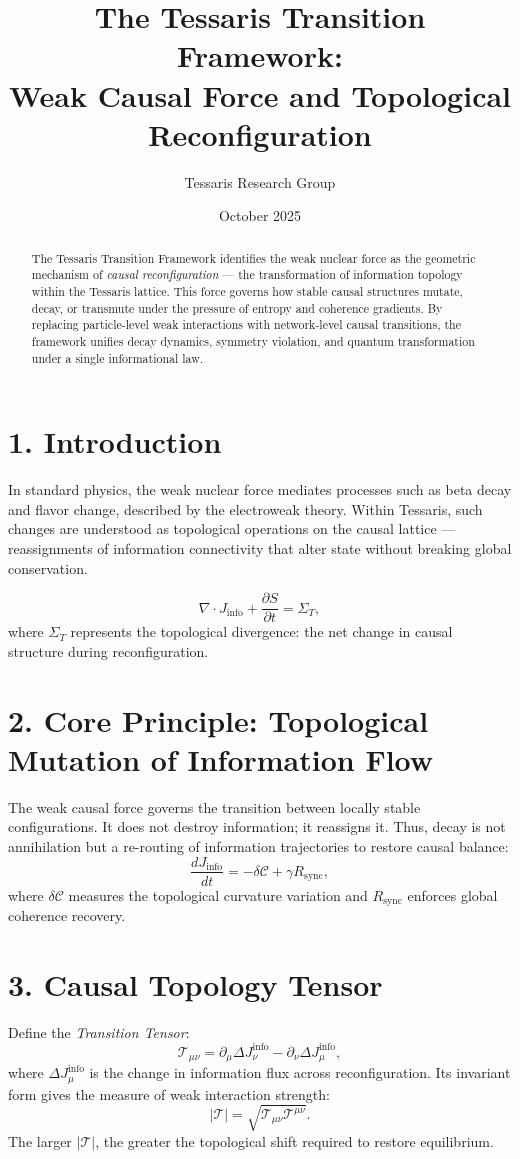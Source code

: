 \documentclass[11pt,a4paper]{article}
\title{\textbf{The Tessaris Transition Framework:\\Weak Causal Force and Topological Reconfiguration}}
\author{Tessaris Research Group}
\date{October 2025}
\begin{document}
\maketitle

\begin{abstract}
The Tessaris Transition Framework identifies the weak nuclear force as the geometric mechanism of \emph{causal reconfiguration} --- the transformation of information topology within the Tessaris lattice.  
This force governs how stable causal structures mutate, decay, or transmute under the pressure of entropy and coherence gradients.  
By replacing particle-level weak interactions with network-level causal transitions, the framework unifies decay dynamics, symmetry violation, and quantum transformation under a single informational law.
\end{abstract}

\section{1. Introduction}
In standard physics, the weak nuclear force mediates processes such as beta decay and flavor change, described by the electroweak theory.  
Within Tessaris, such changes are understood as topological operations on the causal lattice --- reassignments of information connectivity that alter state without breaking global conservation.

\[
\nabla\!\cdot\!J_{\mathrm{info}} + \frac{\partial S}{\partial t} = \Sigma_T,
\]
where $\Sigma_T$ represents the topological divergence: the net change in causal structure during reconfiguration.

\section{2. Core Principle: Topological Mutation of Information Flow}
The weak causal force governs the transition between locally stable configurations.  
It does not destroy information; it reassigns it.  
Thus, decay is not annihilation but a re-routing of information trajectories to restore causal balance:
\[
\frac{dJ_{\mathrm{info}}}{dt} = -\delta\mathcal{C} + \gamma R_{\mathrm{sync}},
\]
where $\delta\mathcal{C}$ measures the topological curvature variation and $R_{\mathrm{sync}}$ enforces global coherence recovery.

\section{3. Causal Topology Tensor}
Define the \emph{Transition Tensor}:
\[
\mathcal{T}_{\mu\nu} = \partial_\mu \Delta J_{\nu}^{\mathrm{info}} - \partial_\nu \Delta J_{\mu}^{\mathrm{info}},
\]
where $\Delta J_{\mu}^{\mathrm{info}}$ is the change in information flux across reconfiguration.  
Its invariant form gives the measure of weak interaction strength:
\[
|\mathcal{T}| = \sqrt{\mathcal{T}_{\mu\nu}\mathcal{T}^{\mu\nu}}.
\]
The larger $|\mathcal{T}|$, the greater the topological shift required to restore equilibrium.
\end{document}
